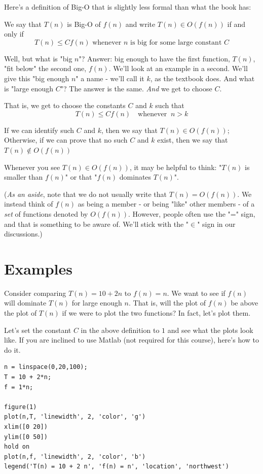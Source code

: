 \documentclass{tufte-handout}
\begin{document}
\bigskip
Here's a definition of Big-O that is slightly less formal than what the book has:

\bigskip
{} We say that $T(n)$ is Big-O of $f(n)$ and write $T(n) \in O(f(n))$ if and only if
$$
T(n) \leq C f(n) \text{ \ whenever } n \text{ is big for some large constant } C 
$$

\bigskip
Well, but what is "big $n$"? Answer: big enough to have the first function, $T(n)$, "fit below" the second one, $f(n)$. 
We'll look at an example in a second. We'll give this "big enough $n$" a name - we'll call it $k$, as the textbook does.
And what is "large enough $C$"? The answer is the same. \emph{And} we get to choose $C$. 

\bigskip
That is, we get to choose the constants $C$ and $k$ such that 
$$
T(n) \leq C f(n) \ \ \ \text{ whenever } \ n > k
$$

\bigskip
If we can identify such $C$ and $k$, then we say that $T(n) \in O(f(n))$; Otherwise, if we can prove that no such $C$ and $k$ exist, then we say that $T(n) \not\in O(f(n))$

\bigskip
Whenever you see $T(n) \in O(f(n))$, it may be helpful to think: "$T(n)$ is smaller than $f(n)$" or that 
"$f(n)$ dominates $T(n)$". 


\bigskip
(\emph{As an aside}, note that we do not usually write that $T(n) = O(f(n))$. We 
instead think of $f(n)$ as being a member - or being "like" other members - of a \emph{set} of functions 
denoted by $O(f(n))$. 
However, people often use the "=" sign, and that is something to be aware of. We'll stick with the "$\in$" sign in our discussions.)

\section{Examples}

 Consider comparing $T(n) = 10 + 2n$ to 
$f(n) = n$. We want to see if $f(n)$ will dominate $T(n)$ for large enough $n$. That is, will 
the plot of $f(n)$ be above the plot of $T(n)$ if
we were to plot the two functions? In fact, let's plot them.

Let's set the constant $C$ in the above definition to $1$ and see what the plots look like. 
If you are inclined to use Matlab (not required for this course), here's how to do it.



\bigskip 

\begin{lstlisting}
n = linspace(0,20,100);
T = 10 + 2*n;
f = 1*n;

figure(1)
plot(n,T, 'linewidth', 2, 'color', 'g')
xlim([0 20])
ylim([0 50])
hold on
plot(n,f, 'linewidth', 2, 'color', 'b')
legend('T(n) = 10 + 2 n', 'f(n) = n', 'location', 'northwest')
\end{lstlisting}
\end{document}
